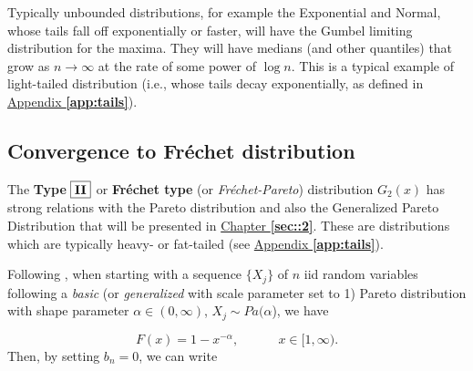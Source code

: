 \vspace{.2cm}
Typically unbounded distributions, for example the Exponential and Normal, whose tails fall off exponentially or faster, will have the Gumbel limiting distribution for the maxima. They will have medians (and other quantiles) that grow as $n\rightarrow\infty$ at the rate
of some power of $\log n$. This is a typical example of light-tailed distribution (i.e., whose tails decay exponentially, as defined in \hyperref[app:tails]{Appendix \textbf{\ref{app:tails}}}).

\vspace{-.3cm}
\subsection*{Convergence to Fréchet distribution}

The \textbf{Type}  $\boxed{\textbf{\text{II}}}$ or \textbf{Fréchet type} (or \emph{Fréchet-Pareto}) distribution $G_2(x)$ has strong relations with the Pareto distribution and also the Generalized Pareto Distribution that will be presented in \hyperref[sec::2]{Chapter \textbf{\ref{sec::2}}}. These are distributions which are typically heavy- or fat-tailed (see \hyperref[app:tails]{Appendix \textbf{\ref{app:tails}}}).

Following \citet{beirlant_practical_1996}, when starting with a sequence $\{X_j\}$ of $n$ iid random variables following a \textit{basic} (or \textit{generalized} with scale parameter set to 1) Pareto distribution with shape parameter $\alpha\in (0,\infty)$, $X_j\sim Pa(\alpha$), we have 

\begin{equation}
F(x)=1-x^{-\alpha}, \ \ \ \ \ \ \ \ \ \ \ \ \ \ x\in[1,\infty).
\end{equation}
Then, by setting $b_n=0$, we can write

